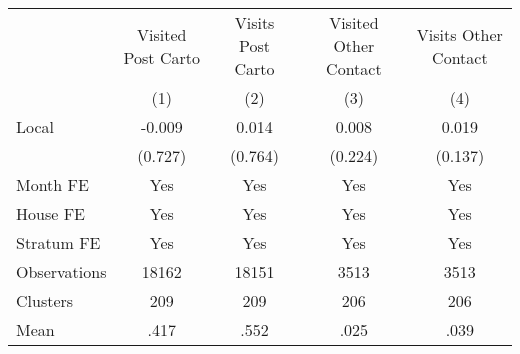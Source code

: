 {
\def\sym#1{\ifmmode^{#1}\else\(^{#1}\)\fi}
\begin{tabular}{l*{4}{c}}
\hline\hline
                &\multicolumn{1}{c}{Visited Post Carto}&\multicolumn{1}{c}{Visits Post Carto}&\multicolumn{1}{c}{Visited Other Contact}&\multicolumn{1}{c}{Visits Other Contact}\\
                &\multicolumn{1}{c}{(1)}         &\multicolumn{1}{c}{(2)}         &\multicolumn{1}{c}{(3)}         &\multicolumn{1}{c}{(4)}         \\
\hline
Local           &   -0.009         &    0.014         &    0.008         &    0.019         \\
                &  (0.727)         &  (0.764)         &  (0.224)         &  (0.137)         \\
Month FE        &      Yes         &      Yes         &      Yes         &      Yes         \\
House FE        &      Yes         &      Yes         &      Yes         &      Yes         \\
Stratum FE      &      Yes         &      Yes         &      Yes         &      Yes         \\
\hline
Observations    &    18162         &    18151         &     3513         &     3513         \\
Clusters        &      209         &      209         &      206         &      206         \\
Mean            &     .417         &     .552         &     .025         &     .039         \\
\hline\hline
\end{tabular}
}
